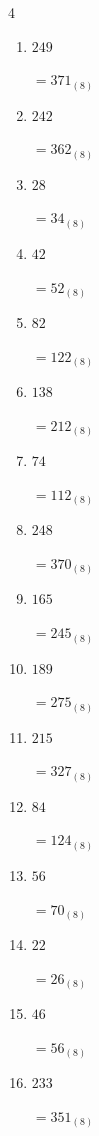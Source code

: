 \begin{multicols}{4}
\begin{enumerate}
        $=113_{(8)}$

  \item $249$

        $=371_{(8)}$

  \item $242$

        $=362_{(8)}$

  \item $28$

        $=34_{(8)}$

  \item $42$

        $=52_{(8)}$

  \item $82$

        $=122_{(8)}$

  \item $138$

        $=212_{(8)}$

  \item $74$

        $=112_{(8)}$

  \item $248$

        $=370_{(8)}$

  \item $165$

        $=245_{(8)}$

\columnbreak %

  \item $189$

        $=275_{(8)}$

  \item $215$

        $=327_{(8)}$

  \item $84$

        $=124_{(8)}$

  \item $56$

        $=70_{(8)}$

  \item $22$

        $=26_{(8)}$

  \item $46$

        $=56_{(8)}$

  \item $233$

        $=351_{(8)}$


\end{enumerate}
\end{multicols}
